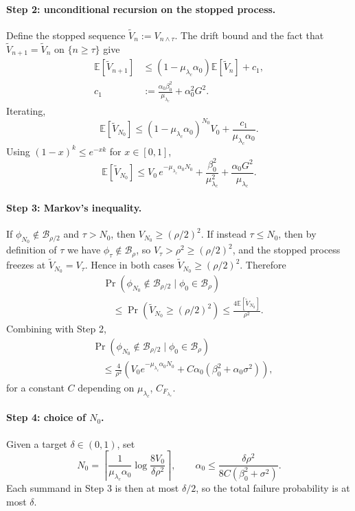 \documentclass{article}
\theoremstyle{plain}
\theoremstyle{definition}
\theoremstyle{remark}
\newcommand{\E}{\mathbb{E}}
\newcommand{\B}{\mathcal{B}}
\begin{document}
\paragraph{Step 2: unconditional recursion on the stopped process.}
Define the stopped sequence $\tilde V_n:=V_{n\wedge\tau}$. The drift bound and the fact that $\tilde V_{n+1}=\tilde V_n$ on $\{n\ge\tau\}$ give
\[
\begin{aligned}
\E[\tilde V_{n+1}]
&\le (1-\mu_{\lambda_c}\alpha_0)\E[\tilde V_n]+c_1,\\
c_1&:=\frac{\alpha_0\beta_0^2}{\mu_{\lambda_c}}+\alpha_0^2G^2.
\end{aligned}
\]
Iterating,
\[
\E[\tilde V_{N_0}]\le (1-\mu_{\lambda_c}\alpha_0)^{N_0}V_0+\frac{c_1}{\mu_{\lambda_c}\alpha_0}.
\]
Using $(1-x)^k\le e^{-xk}$ for $x\in[0,1]$,
\[
\E[\tilde V_{N_0}]\le V_0\,e^{-\mu_{\lambda_c}\alpha_0 N_0}+\frac{\beta_0^2}{\mu_{\lambda_c}^2}+\frac{\alpha_0 G^2}{\mu_{\lambda_c}}.
\]

\paragraph{Step 3: Markov's inequality.}
If $\phi_{N_0}\notin\B_{\rho/2}$ and $\tau>N_0$, then $V_{N_0}\ge(\rho/2)^2$. If instead $\tau\le N_0$, then by definition of $\tau$ we have $\phi_\tau\notin\B_\rho$, so $V_\tau>\rho^2\ge(\rho/2)^2$, and the stopped process freezes at $\tilde V_{N_0}=V_\tau$. Hence in both cases $\tilde V_{N_0}\ge(\rho/2)^2$. Therefore
\[
\begin{aligned}
&\Pr(\phi_{N_0}\notin\B_{\rho/2}\mid \phi_0\in\B_\rho)\\
&\quad\le \Pr(\tilde V_{N_0}\ge (\rho/2)^2)
\le \frac{4\E[\tilde V_{N_0}]}{\rho^2}.
\end{aligned}
\]
Combining with Step 2,
\[
\begin{aligned}
&\Pr(\phi_{N_0}\notin\B_{\rho/2}\mid\phi_0\in\B_\rho)\\
&\quad\le \frac{4}{\rho^2}\!\left(
V_0 e^{-\mu_{\lambda_c}\alpha_0 N_0}
+C\alpha_0(\beta_0^2+\alpha_0\sigma^2)\right),
\end{aligned}
\]
for a constant $C$ depending on $\mu_{\lambda_c}$, $C_{F_{\lambda_c}}$.

\paragraph{Step 4: choice of $N_0$.}
Given a target $\delta\in(0,1)$, set
\[
N_0=\left\lceil\frac{1}{\mu_{\lambda_c}\alpha_0}\log\!\frac{8V_0}{\delta\rho^2}\right\rceil,
\qquad \alpha_0\le \frac{\delta\rho^2}{8C(\beta_0^2+\sigma^2)}.
\]
Each summand in Step 3 is then at most $\delta/2$, so the total failure probability is at most $\delta$.
\end{document}
